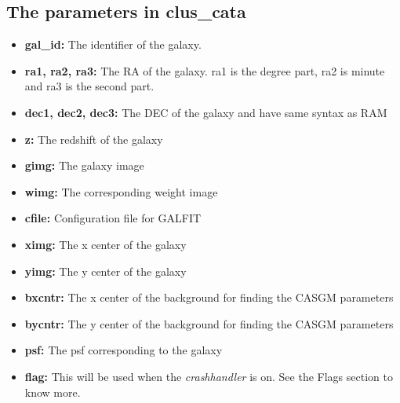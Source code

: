\documentclass[a4paper,12pt]{article}
\begin{document}
\subsection{The parameters in clus\_cata}
\begin{itemize}
\item \textbf{ gal\_id:} The identifier of the galaxy.
\item \textbf{ ra1, ra2, ra3:} The RA of the galaxy. ra1 is the degree part, ra2 is minute and ra3
 is the second part.
\item \textbf{ dec1, dec2, dec3:} The DEC of the galaxy and have same syntax as RAM
\item \textbf{ z:} The redshift of the galaxy
\item \textbf{ gimg:} The galaxy image
\item \textbf{ wimg:} The corresponding weight image
\item \textbf{ cfile:} Configuration file for GALFIT
\item \textbf{ ximg:} The x center of the galaxy
\item \textbf{ yimg:} The y center of the galaxy
\item \textbf{ bxcntr:} The x center of the background for finding the CASGM parameters
\item \textbf{ bycntr:} The y center of the background for finding the CASGM parameters
\item \textbf{ psf:} The psf corresponding to the galaxy
\item \textbf{ flag:} This will be used when the\textit{ crashhandler} is on. See the Flags section to know more.
\end{itemize}
\end{document}
